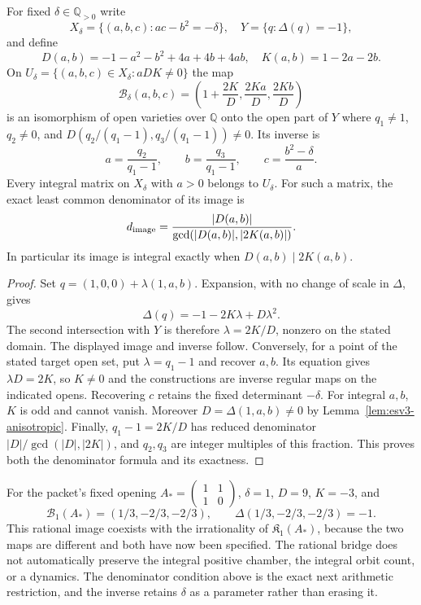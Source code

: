 \begin{theorem}\label{thm:esv3-rational-bridge}
For fixed $\delta\in\mathbb Q_{>0}$ write
\[
 X_\delta=\{(a,b,c):ac-b^2=-\delta\},\quad
 Y=\{q:\Delta(q)=-1\},
\]
and define
\[
 D(a,b)=-1-a^2-b^2+4a+4b+4ab,\quad K(a,b)=1-2a-2b.
\]
On $U_\delta=\{(a,b,c)\in X_\delta:aDK\ne0\}$ the map
\[
 \mathcal B_\delta(a,b,c)=
 \left(1+\frac{2K}{D},\frac{2Ka}{D},\frac{2Kb}{D}\right)
 \label{eq:esv3-birational}
\]
is an isomorphism of open varieties over $\mathbb Q$ onto the open part of
$Y$ where $q_1\ne1$, $q_2\ne0$, and
$D(q_2/(q_1-1),q_3/(q_1-1))\ne0$. Its inverse is
\[
 a=\frac{q_2}{q_1-1},\qquad b=\frac{q_3}{q_1-1},\qquad
 c=\frac{b^2-\delta}{a}.
\]
Every integral matrix on $X_\delta$ with $a>0$ belongs to $U_\delta$.
For such a matrix, the exact least common denominator of its image is
\[
 d_{\rm image}=\frac{|D(a,b)|}{\gcd(|D(a,b)|,|2K(a,b)|)}.
\]
In particular its image is integral exactly when $D(a,b)\mid2K(a,b)$.
\end{theorem}
\begin{proof}
Set $q=(1,0,0)+\lambda(1,a,b)$. Expansion, with no change of scale in
$\Delta$, gives
\[
 \Delta(q)=-1-2K\lambda+D\lambda^2.
\]
The second intersection with $Y$ is therefore $\lambda=2K/D$, nonzero
on the stated domain. The displayed image and inverse follow. Conversely,
for a point of the stated target open set, put $\lambda=q_1-1$ and recover
$a,b$. Its equation gives $\lambda D=2K$, so $K\ne0$ and the constructions
are inverse regular maps on the indicated opens. Recovering $c$ retains the
fixed determinant $-\delta$. For integral $a,b$, $K$ is odd and cannot
vanish. Moreover $D=\Delta(1,a,b)\ne0$ by
Lemma~\ref{lem:esv3-anisotropic}. Finally, $q_1-1=2K/D$ has reduced
denominator $|D|/\gcd(|D|,|2K|)$, and $q_2,q_3$ are integer multiples
of this fraction. This proves both the denominator formula and its exactness.
\end{proof}

For the packet's fixed opening
$A_*=\left(\begin{smallmatrix}1&1\\1&0\end{smallmatrix}\right)$,
$\delta=1$, $D=9$, $K=-3$, and
\[
 \mathcal B_1(A_*)=(1/3,-2/3,-2/3),\qquad
 \Delta(1/3,-2/3,-2/3)=-1.
\]
This rational image coexists with the irrationality of
$\mathfrak K_1(A_*)$, because the two maps are different and both have now
been specified. The rational bridge does not automatically preserve the
integral positive chamber, the integral orbit count, or a dynamics. The
denominator condition above is the exact next arithmetic restriction, and
the inverse retains $\delta$ as a parameter rather than erasing it.

